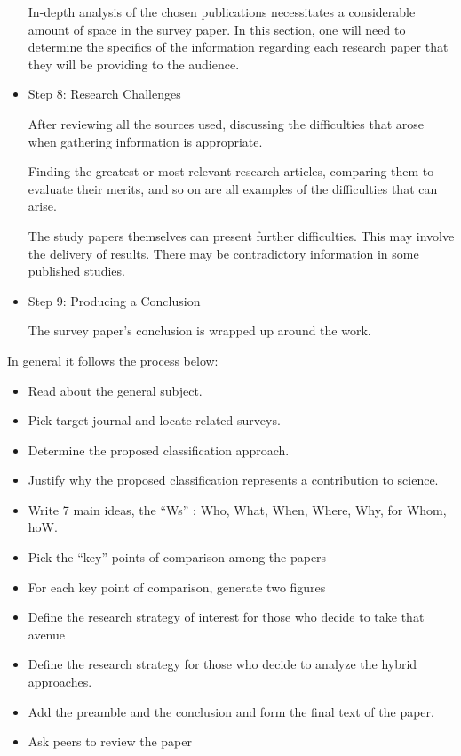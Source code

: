 \begin{itemize}
    In-depth analysis of the chosen publications necessitates a considerable amount of space in the survey paper. In this section, one will need to determine the specifics of the information regarding each research paper that they will be providing to the audience. 
    \\
    \item Step 8: Research Challenges 
    
    After reviewing all the sources used, discussing the difficulties that arose when gathering information is appropriate.  
    
    Finding the greatest or most relevant research articles, comparing them to evaluate their merits, and so on are all examples of the difficulties that can arise. 
    
    The study papers themselves can present further difficulties. This may involve the delivery of results. There may be contradictory information in some published studies. 
    \\
    \item Step 9: Producing a Conclusion 
    
    The survey paper's conclusion is wrapped up around the work. 
\end{itemize}    
    In general it follows the process below: 
 
\begin{itemize}   
    \item Read about the general subject. 
    
    \item Pick target journal and locate related surveys. 
    
    \item Determine the proposed classification approach. 
    
    \item Justify why the proposed classification represents a contribution to science. 
    
    \item Write 7 main ideas, the “Ws” : Who, What, When, Where, Why, for Whom, hoW. 
    
    \item Pick the “key” points of comparison among the papers 
    
    \item For each key point of comparison, generate two figures 
    
    \item Define the research strategy of interest for those who decide to take that avenue 
    
    \item Define the research strategy for those who decide to analyze the hybrid approaches. 
    
    \item Add the preamble and the conclusion and form the final text of the paper. 
    
    \item Ask peers to review the paper 
\end{itemize} 

